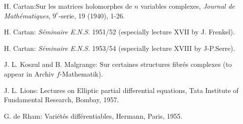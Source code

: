 \begin{thebibliography}{99}
 H. Cartan:\pageoriginale Sur les matrices holomorphes
  de $n$ variables complexes, \textit{Journal de Math\'ematiques}, 
  $9^e$-serie, 19 (1940), 1-26.

 H. Cartan: \textit{S\'eminaire E.N.S.} 1951/52
  (especially lecture XVII by J. Frenkel). 

 H. Cartan: \textit{S\'eminaire E.N.S.} 1953/54
  (especially lecture  XVIII by J-P.Serre).

 J. L. Koszul and B. Malgrange: Sur certaines structures
  fibr\'es complexes (to appear in Archiv $f$-Mathematik). 

 J. L. Lions: Lectures on Elliptic partial differential
  equations, Tata Institute of Fundamental Research, Bombay, 1957. 

 G. de Rham: Vari\'et\'es diff\'erentiables, Hermann,
  Paris, 1955. 
\end{thebibliography}
